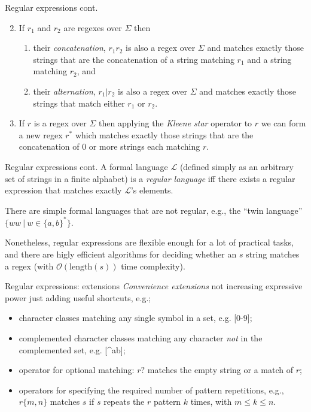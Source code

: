 \documentclass[style=upen, size=14pt]{powerdot}
\newcommand{\gold}{\color{arany}}
\theoremstyle{definition}
\begin{document}
\begin{slide}[toc=]{Regular expressions cont.}
  \begin{enumerate}
     \setcounter{enumi}{1}
  \item If $r_1$ and $r_2$ are regexes over $\Sigma$ then
    \begin{enumerate}
    \item their \emph{\gold concatenation}, $r_1 r_2$ is also a regex over $\Sigma$ and
      matches exactly those strings that are the concatenation of a string
      matching $r_1$ and a string matching $r_2$, and
    \item their \emph{\gold alternation}, $r_1 \vert r_2$ is also a regex over
      $\Sigma$ and matches exactly those strings that match either $r_1$ or
      $r_2$.
    \end{enumerate}
  \item If $r$ is a regex over $\Sigma$ then applying the \emph{\gold Kleene
      star} operator to $r$ we can form a new regex $r^*$ which matches exactly
    those strings that are the concatenation of 0 or more strings each
    matching $r$.
  \end{enumerate}
\end{slide}

\begin{slide}[toc=]{Regular expressions cont.}
  A formal language $\mathcal L$ (defined simply as an arbitrary set of strings
  in a finite alphabet) is a \emph{\gold regular language} iff there exists a
  regular expression that matches exactly $\mathcal L$'s elements.\bigskip

  There are simple formal languages that are not regular, e.g., the ``twin
  language'' $\{ww ~\vert~ w \in \{a, b\}^* \}$.\bigskip

  Nonetheless, regular expressions are flexible enough for a lot of practical
  tasks, and there are higly efficient algorithms for deciding whether an $s$
  string matches a regex (with $\mathcal O(\mathrm{length}(s))$ time
  complexity).
\end{slide}


\begin{slide}[toc=]{Regular expressions: extensions}
  \emph{\gold Convenience extensions} not increasing expressive power just adding useful
  shortcuts, e.g.;
  \begin{itemize}
  \item character classes matching any single symbol in a set, e.g. [0-9];
  \item complemented character classes matching any character \emph{not} in the
    complemented set, e.g. [\^{}ab];
  \item operator for optional  matching: $r?$ matches the empty string or a match of $r$;
  \item operators for specifying the required number of pattern repetitions,
    e.g., $r\{m,n\}$ matches $s$ if $s$ repeats the $r$ pattern $k$ times, with
    $m\leq k \leq n$.
  \end{itemize}
\end{slide}
\end{document}
